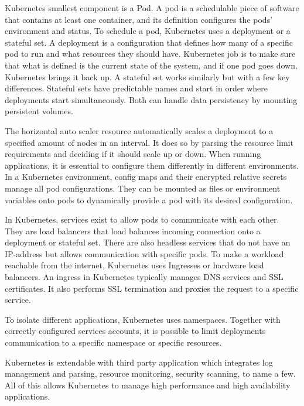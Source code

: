 Kubernetes smallest component is a Pod. A pod is a schedulable piece of software that contains at least one container, and its definition configures the pods' environment and status. To schedule a pod, Kubernetes uses a deployment or a stateful set. A deployment is a configuration that defines how many of a specific pod to run and what resources they should have. Kubernetes job is to make sure that what is defined is the current state of the system, and if one pod goes down, Kubernetes brings it back up. A stateful set works similarly but with a few key differences. Stateful sets have predictable names and start in order where deployments start simultaneously. Both can handle data persistency by mounting persistent volumes.

The horizontal auto scaler resource automatically scales a deployment to a specified amount of nodes in an interval. It does so by parsing the resource limit requirements and deciding if it should scale up or down. When running applications, it is essential to configure them differently in different environments. In a Kubernetes environment, config maps and their encrypted relative secrets manage all pod configurations. They can be mounted as files or environment variables onto pods to dynamically provide a pod with its desired configuration. 

In Kubernetes, services exist to allow pods to communicate with each other. They are load balancers that load balances incoming connection onto a deployment or stateful set. There are also headless services that do not have an IP-address but allows communication with specific pods. To make a workload reachable from the internet, Kubernetes uses Ingresses or hardware load balancers. An ingress in Kubernetes typically manages DNS services and SSL certificates. It also performs SSL termination and proxies the request to a specific service.   

To isolate different applications, Kubernetes uses namespaces. Together with correctly configured services accounts, it is possible to limit deployments communication to a specific namespace or specific resources.

Kubernetes is extendable with third party application which integrates log management and parsing, resource monitoring, security scanning, to name a few. All of this allows Kubernetes to manage high performance and high availability applications. 
